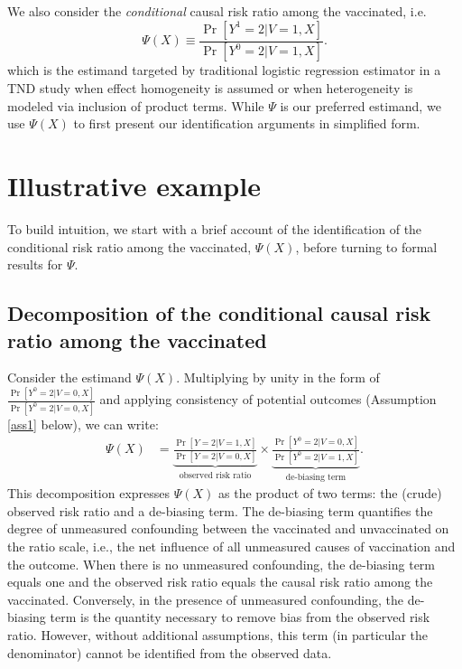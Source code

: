 \documentclass[11pt]{article}
\begin{document}
We also consider the \textit{conditional} causal risk ratio among the vaccinated, i.e. 
\begin{equation*}
    \Psi(X) \equiv \frac{\Pr[Y^1 = 2 | V = 1, X]}{\Pr[Y^0 = 2 | V = 1, X]}.
\end{equation*}
which is the estimand targeted by traditional logistic regression estimator in a TND study when effect homogeneity is assumed or when heterogeneity is modeled via inclusion of product terms. While $\Psi$ is our preferred estimand, we use $\Psi(X)$ to first present our identification arguments in simplified form.

\section*{Illustrative example} \label{sec:roadmap}
To build intuition, we start with a brief account of the identification of the conditional risk ratio among the vaccinated, $\Psi(X)$, before turning to formal results for $\Psi$. 

\subsection*{Decomposition of the conditional causal risk ratio among the vaccinated}
Consider the estimand $\Psi(X)$. Multiplying by unity in the form of $\frac{\Pr[Y^0 = 2 | V = 0, X]}{\Pr[Y^0 = 2 | V = 0, X]}$ and applying consistency of potential outcomes (Assumption \ref{ass1} below), we can write:
\begin{align} \label{eqn:decomposition}
    \Psi(X) &=\underbrace{\frac{\Pr[Y = 2| V = 1, X]}{\Pr[Y = 2 | V = 0, X]}}_{\text{observed risk ratio}} \times \underbrace{\frac{\Pr[Y^0 = 2 | V = 0, X]}{\Pr[Y^0 = 2 | V = 1, X]}}_{\text{de-biasing term}}.
\end{align}
This decomposition expresses $\Psi(X)$ as the product of two terms: the (crude) observed risk ratio and a de-biasing term. The de-biasing term quantifies the degree of unmeasured confounding between the vaccinated and unvaccinated on the ratio scale, i.e., the net influence of all unmeasured causes of vaccination and the outcome. When there is no unmeasured confounding, the de-biasing term equals one and the observed risk ratio equals the causal risk ratio among the vaccinated. Conversely, in the presence of unmeasured confounding, the de-biasing term is the quantity necessary to remove bias from the observed risk ratio. However, without additional assumptions, this term (in particular the denominator) cannot be identified from the observed data. 
\end{document}
